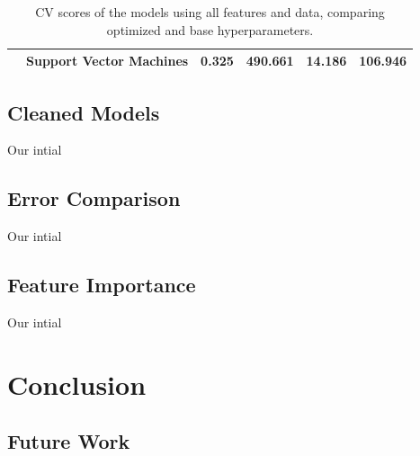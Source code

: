 \documentclass[twocolumn, nofootinbib, secnumarabic, amssymb, nobibnotes, aps, prd]{revtex4-2}
\begin{document}
\begin{table}[!hbt]
{\begin{tabular}{clcccc}
                                                                                                     & \textbf{Support Vector Machines}  & 0.325                           & 490.661                          & 14.186                           & 106.946                          \\ \hline
\end{tabular}%
}
\caption{CV scores of the models using all features and data, comparing optimized and base hyperparameters.}
\label{tab:results}
\end{table}

\subsection{Cleaned Models}
Our intial

\subsection{Error Comparison}
Our intial

\subsection{Feature Importance}
Our intial

\section{Conclusion}
\subsection{Future Work}




\end{document}
